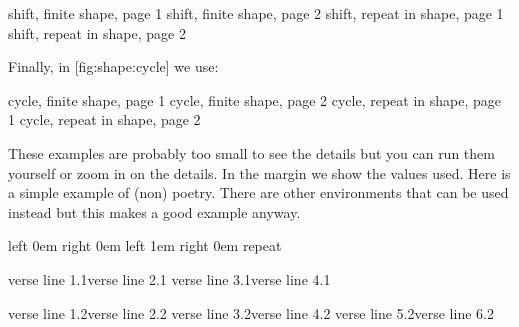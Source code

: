 
\startplacefigure[title=Shifted shaping,reference=fig:shape:shift]
              {shift, finite shape,    page 1}
    {}              {shift, finite shape,    page 2}
    {} {shift, repeat in shape, page 1}
    {} {shift, repeat in shape, page 2}
\stopcombination
\stopplacefigure

Finally, in  [fig:shape:cycle] we use:

\startbuffer[demo-3]
\startshapedparagraph[list=test,method=cycle]
\stopshapedparagraph
\stopbuffer

\startshapedparagraph[list=test-repeat,method=cycle]
\stopshapedparagraph
\stopbuffer


\startplacefigure[title=Cycled shaping,reference=fig:shape:cycle]
              {cycle, finite shape,    page 1}
    {}              {cycle, finite shape,    page 2}
    {} {cycle, repeat in shape, page 1}
    {} {cycle, repeat in shape, page 2}
\stopcombination
\stopplacefigure

These examples are probably too small to see the details but you can run them
yourself or zoom in on the details. In the margin we show the values used. Here
is a simple example of (non) poetry. There are other environments that can be
used instead but this makes a good example anyway.

\startbuffer
\startparagraphshape[test]
    left 0em right 0em
    left 1em right 0em
    repeat
\stopparagraphshape

\startshapedparagraph[list=test,method=cycle]
    verse line 1.1\crlf verse line 2.1\crlf
    verse line 3.1\crlf verse line 4.1\par
    verse line 1.2\crlf verse line 2.2\crlf
    verse line 3.2\crlf verse line 4.2\crlf
    verse line 5.2\crlf verse line 6.2\par
\stopshapedparagraph
\stopbuffer

